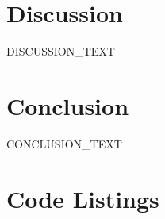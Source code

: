 \documentclass[12pt, a4paper]{article}
\begin{document}

\section{Discussion}
\label{sec:discussion}

DISCUSSION_TEXT

\section{Conclusion}
\label{sec:conclusion}

CONCLUSION_TEXT


\appendix

\section{Code Listings}
\label{app:code}

% 
\end{document}
